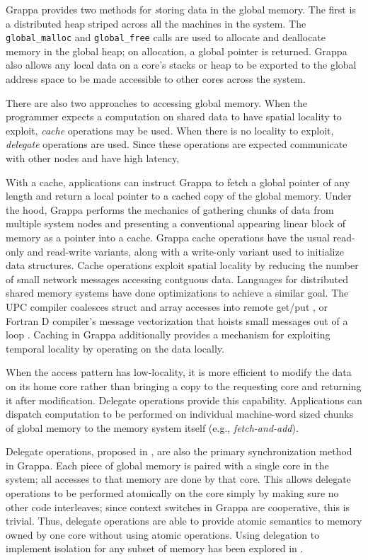 Grappa provides two methods for {\emph storing} data in the global memory. The
first is a distributed heap striped across all the machines in the
system. The \texttt{global\_malloc} and \texttt{global\_free} calls
are used to allocate and deallocate memory in the global heap; on
allocation, a global pointer is returned. Grappa also allows any local
data on a core's stacks or heap to be exported to the global address
space to be made accessible to other cores across the system.

There are also two approaches to {\emph accessing} global memory. When the
programmer expects a computation on shared data to have spatial
locality to exploit, {\em cache} operations may be used. When there is no locality to
exploit, {\em delegate} operations are used. Since these operations
are expected communicate with other nodes and have high latency,

With a cache, applications can instruct Grappa to fetch a global
pointer of any length and return a local pointer to a cached copy of
the global memory. Under the hood, Grappa performs the mechanics of
gathering chunks of data from multiple system nodes and presenting a
conventional appearing linear block of memory as a pointer into a
cache. Grappa cache operations have the usual read-only and read-write
variants, along with a write-only variant used to initialize data
structures. Cache operations exploit spatial locality by reducing the number of small network
messages accessing contguous data. Languages for distributed
shared memory systems have done optimizations to achieve a similar goal. The UPC compiler
coalesces struct and array accesses into 
remote get/put \cite{Chen:2005}, or Fortran D compiler's message
vectorization that hoists small messages out of a loop
\cite{FortranD:1992}. Caching in Grappa additionally provides a
mechanism for exploiting temporal locality by operating on the data locally. 

When the access pattern has low-locality, it is more efficient
to modify the data on its home core rather than bringing a copy to the
requesting core and returning it after modification. Delegate
operations provide this capability. Applications can dispatch
computation to be performed on individual machine-word sized chunks of
global memory to the memory system itself (e.g.,
\emph{fetch-and-add}).

Delegate operations, proposed in \cite{Nelson:hotpar11}, are also the primary synchronization method in
Grappa. Each piece of global memory is paired with a single core in
the system; all accesses to that memory are done by that core. This
allows delegate operations to be performed atomically on the core
simply by making sure no other code interleaves; since context
switches in Grappa are cooperative, this is trivial. Thus, delegate
operations are able to provide atomic semantics to memory owned by one core without using atomic
operations. Using delegation to implement isolation for any subset of
memory has been explored in \cite{delegated:oopsla11}.

